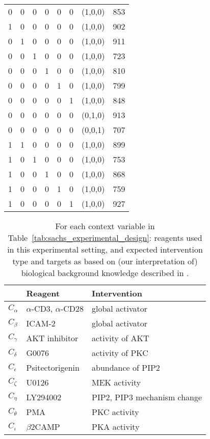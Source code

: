 \documentclass[twoside,11pt]{article}
\begin{document}
\begin{table}[t!]
\begin{tabular}{|ccccccc|c|}
\hline
  0 & 0 & 0 & 0 & 0 & 0 & (1,0,0) & 853 \\
  1 & 0 & 0 & 0 & 0 & 0 & (1,0,0) & 902 \\
  0 & 1 & 0 & 0 & 0 & 0 & (1,0,0) & 911 \\
  0 & 0 & 1 & 0 & 0 & 0 & (1,0,0) & 723 \\
  0 & 0 & 0 & 1 & 0 & 0 & (1,0,0) & 810 \\
  0 & 0 & 0 & 0 & 1 & 0 & (1,0,0) & 799 \\
  0 & 0 & 0 & 0 & 0 & 1 & (1,0,0) & 848 \\
  0 & 0 & 0 & 0 & 0 & 0 & (0,1,0) & 913 \\
  0 & 0 & 0 & 0 & 0 & 0 & (0,0,1) & 707 \\
  1 & 1 & 0 & 0 & 0 & 0 & (1,0,0) & 899 \\
  1 & 0 & 1 & 0 & 0 & 0 & (1,0,0) & 753 \\
  1 & 0 & 0 & 1 & 0 & 0 & (1,0,0) & 868 \\
  1 & 0 & 0 & 0 & 1 & 0 & (1,0,0) & 759 \\
  1 & 0 & 0 & 0 & 0 & 1 & (1,0,0) & 927 \\
\hline
\end{tabular}\end{table}
\begin{table}[t!]
  \caption{For each context variable in Table~\ref{tab:sachs_experimental_design}: reagents used in this experimental setting, and expected intervention type and targets as based on (our interpretation of) biological background knowledge described in \citet{SPP05}.\label{tab:sachs_contexts}}
  \centering
  \begin{tabular}{l|ll}
     & Reagent & Intervention \\
    \hline
    $C_\alpha$ & $\alpha$-CD3, $\alpha$-CD28 & global activator \\
    $C_\beta$ & ICAM-2 & global activator \\
    $C_\gamma$ & AKT inhibitor & activity of AKT \\
    $C_\delta$ & G0076 & activity of PKC \\
    $C_\epsilon$ & Psitectorigenin & abundance of PIP2 \\
    $C_\zeta$ & U0126 & MEK activity \\
    $C_\eta$ & LY294002 & PIP2, PIP3 mechanism change \\
    $C_\theta$ & PMA & PKC activity \\
    $C_\iota$ & $\beta$2CAMP & PKA activity \\
  \end{tabular}
\end{table}
\end{document}
